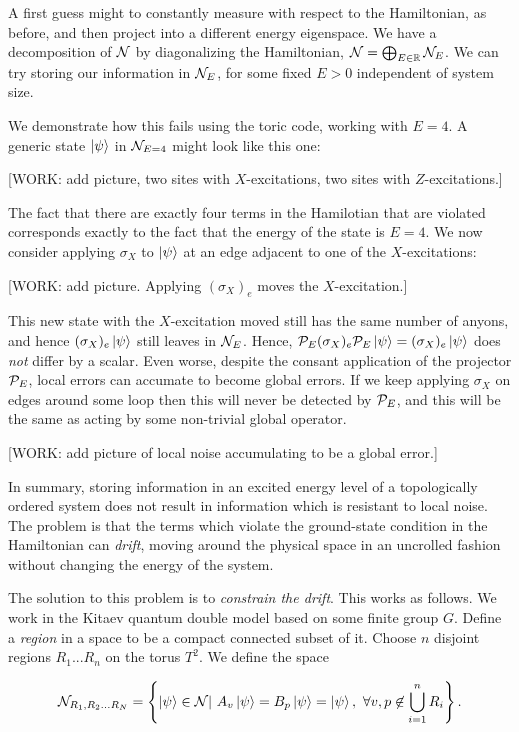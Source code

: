 A first guess might to constantly measure with respect to the Hamiltonian, as before, and then project into a different energy eigenspace. We have a decomposition of $\mathcal{N}$ by diagonalizing the Hamiltonian, $\mathcal{N}=\bigoplus_{E\in \mathbb{R}}\mathcal{N}_{E}$. We can try storing our information in $\mathcal{N}_{E}$, for some fixed $E>0$ independent of system size.

We demonstrate how this fails using the toric code, working with $E=4$. A generic state $\ket{\psi}$ in $\mathcal{N}_{E=4}$ might look like this one:

[WORK: add picture, two sites with $X$-excitations, two sites with $Z$-excitations.]

The fact that there are exactly four terms in the Hamilotian that are violated corresponds exactly to the fact that the energy of the state is $E=4$. We now consider applying $\sigma_{X}$ to $\ket{\psi}$ at an edge adjacent to one of the $X$-excitations:

[WORK: add picture. Applying $(\sigma_X)_e$ moves the $X$-excitation.]

This new state with the $X$-excitation moved still has the same number of anyons, and hence $(\sigma_X)_e\ket{\psi}$ still leaves in $\mathcal{N}_{E}$. Hence, $\mathcal{P}_{E}(\sigma_X)_e\mathcal{P}_{E}\ket{\psi}=(\sigma_X)_e\ket{\psi}$ does \textit{not} differ by a scalar. Even worse, despite the consant application of the projector $\mathcal{P}_{E}$, local errors can accumate to become global errors. If we keep applying $\sigma_X$ on edges around some loop then this will never be detected by $\mathcal{P}_{E}$, and this will be the same as acting by some non-trivial global operator. 

[WORK: add picture of local noise accumulating to be a global error.]

In summary, storing information in an excited energy level of a topologically ordered system does not result in information which is resistant to local noise. The problem is that the terms which violate the ground-state condition in the Hamiltonian can \textit{drift}, moving around the physical space in an uncrolled fashion without changing the energy of the system.

The solution to this problem is to \textit{constrain the drift}. This works as follows. We work in the Kitaev quantum double model based on some finite group $G$. Define a \textit{region} in a space to be a compact connected subset of it. Choose $n$ disjoint regions $R_1...R_n$ on the torus $T^2$. We define the space


$$\mathcal{N}_{R_1,R_2... R_N}=\left\{\ket{\psi}\in \mathcal{N} | \,\, A_v\ket{\psi}=B_p\ket{\psi}=\ket{\psi},\,\, \forall v,p\not\in \bigcup_{i=1}^n R_i \right\}.$$

